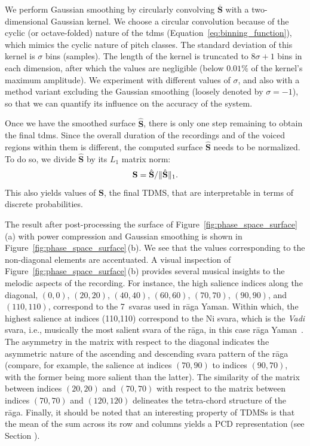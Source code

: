 We perform Gaussian smoothing by circularly convolving $\overline{\mathbf{S}}$ with a two-dimensional Gaussian kernel. We choose a circular convolution because of the cyclic (or octave-folded) nature of the \gls{tdms} (Equation~\ref{eq:binning_function}), which mimics the cyclic nature of pitch classes. The standard deviation of this kernel is $\sigma$ bins (samples). The length of the kernel is truncated to $8\sigma + 1$ bins in each dimension, after which the values are negligible (below $0.01\%$ of the kernel's maximum amplitude). We experiment with different values of $\sigma$, and also with a method variant excluding the Gaussian smoothing (loosely denoted by $\sigma = -1$), so that we can quantify its influence on the accuracy of the system. 
%

Once we have the smoothed surface $\hat{\mathbf{S}}$, there is only one step remaining to obtain the final \gls{tdms}. Since the overall duration of the recordings and of the voiced regions within them is different, the computed surface $\hat{\mathbf{S}}$ needs to be normalized. To do so, we divide $\hat{\mathbf{S}}$ by its $L_1$ matrix norm:
\begin{equation*}
\mathbf{S} = \hat{\mathbf{S}}/\lVert\hat{\mathbf{S}}\rVert_{1} .
\end{equation*}
This also yields values of $\mathbf{S}$, the final TDMS, that are interpretable in terms of discrete probabilities.

The result after post-processing the surface of Figure~\ref{fig:phase_space_surface}\,(a) with power compression and Gaussian smoothing is shown in Figure~\ref{fig:phase_space_surface}\,(b). We see that the values corresponding to the non-diagonal elements are accentuated. A visual inspection of Figure~\ref{fig:phase_space_surface}\,(b) provides several musical insights to the melodic aspects of the recording. For instance, the high salience indices along the diagonal, $(0,0)$, $(20,20)$, $(40,40)$, $(60,60)$, $(70,70)$, $(90,90)$, and $(110,110)$, correspond to the 7~svaras used in r\={a}ga Yaman. Within which, the highest salience at indices (110,110) correspond to the Ni svara, which is the {\it Vadi} svara, i.e., musically the most salient svara of the r\={a}ga, in this case r\={a}ga Yaman~\cite{rao1999raga}. The asymmetry in the matrix with respect to the diagonal indicates the asymmetric nature of the ascending and descending svara pattern of the r\={a}ga (compare, for example, the salience at indices $(70, 90)$ to indices $(90, 70)$, with the former being more salient than the latter). The similarity of the matrix between indices $(20,20)$ and $(70,70)$ with respect to the matrix between indices $(70,70)$ and $(120,120)$ delineates the tetra-chord structure of the r\={a}ga. Finally, it should be noted that an interesting property of TDMSs is that the mean of the sum across its row and columns yields a PCD representation (see Section ).

